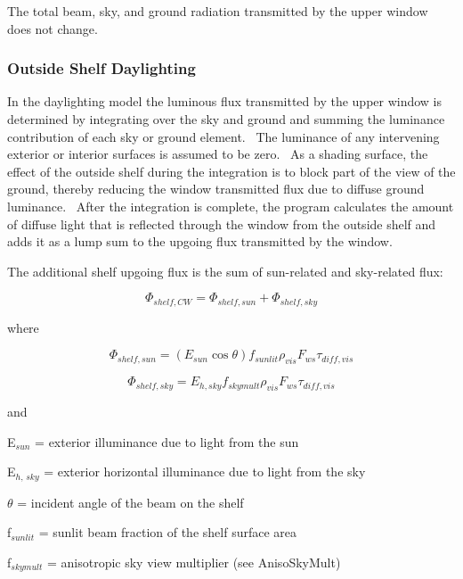 The total beam, sky, and ground radiation transmitted by the upper window does not change.

\subsubsection{Outside Shelf Daylighting}\label{outside-shelf-daylighting}

In the daylighting model the luminous flux transmitted by the upper window is determined by integrating over the sky and ground and summing the luminance contribution of each sky or ground element.~ The luminance of any intervening exterior or interior surfaces is assumed to be zero.~ As a shading surface, the effect of the outside shelf during the integration is to block part of the view of the ground, thereby reducing the window transmitted flux due to diffuse ground luminance.~ After the integration is complete, the program calculates the amount of diffuse light that is reflected through the window from the outside shelf and adds it as a lump sum to the upgoing flux transmitted by the window.

The additional shelf upgoing flux is the sum of sun-related and sky-related flux:

\begin{equation}
{\Phi_{shelf,CW}} = {\Phi_{shelf,sun}} + {\Phi_{shelf,sky}}
\end{equation}

where

\begin{equation}
{\Phi_{shelf,sun}} = \left( {{E_{sun}}\cos \theta } \right){f_{sunlit}}{\rho_{vis}}{F_{ws}}{\tau_{diff,vis}}
\end{equation}

\begin{equation}
{\Phi_{shelf,sky}} = {E_{h,sky}}{f_{skymult}}{\rho_{vis}}{F_{ws}}{\tau_{diff,vis}}
\end{equation}

and

E\(_{sun}\) = exterior illuminance due to light from the sun

E\(_{h,\,sky}\) = exterior horizontal illuminance due to light from the sky

\(\theta\) = incident angle of the beam on the shelf

f\(_{sunlit}\) = sunlit beam fraction of the shelf surface area

f\(_{skymult}\) = anisotropic sky view multiplier (see AnisoSkyMult)

